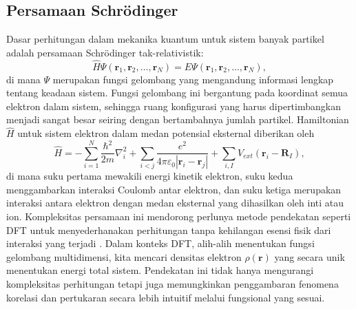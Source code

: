 \subsection{Persamaan Schrödinger}
Dasar perhitungan dalam mekanika kuantum untuk sistem banyak partikel adalah persamaan Schrödinger tak-relativistik:
\begin{equation}
    \hat{H}\Psi(\mathbf{r}_1,\mathbf{r}_2,\ldots,\mathbf{r}_N) = E\Psi(\mathbf{r}_1,\mathbf{r}_2,\ldots,\mathbf{r}_N),
\end{equation}
di mana \(\Psi\) merupakan fungsi gelombang yang mengandung informasi lengkap tentang keadaan sistem.
Fungsi gelombang ini bergantung pada koordinat semua elektron dalam sistem, sehingga ruang konfigurasi yang harus dipertimbangkan menjadi sangat besar seiring dengan bertambahnya jumlah partikel.
Hamiltonian \(\hat{H}\) untuk sistem elektron dalam medan potensial eksternal diberikan oleh
\begin{equation}
    \hat{H} = -\sum_{i=1}^{N}\frac{\hbar^2}{2m}\nabla_i^2 + \sum_{i<j} \frac{e^2}{4\pi\varepsilon_0|\mathbf{r}_i-\mathbf{r}_j|} + \sum_{i,I} V_{ext}(\mathbf{r}_i-\mathbf{R}_I),
\end{equation}
di mana suku pertama mewakili energi kinetik elektron, suku kedua menggambarkan interaksi Coulomb antar elektron, dan suku ketiga merupakan interaksi antara elektron dengan medan eksternal yang dihasilkan oleh inti atau ion.
Kompleksitas persamaan ini mendorong perlunya metode pendekatan seperti DFT untuk menyederhanakan perhitungan tanpa kehilangan esensi fisik dari interaksi yang terjadi \citep{Kohn1965}.
Dalam konteks DFT, alih-alih menentukan fungsi gelombang multidimensi, kita mencari densitas elektron \(\rho(\mathbf{r})\) yang secara unik menentukan energi total sistem.
Pendekatan ini tidak hanya mengurangi kompleksitas perhitungan tetapi juga memungkinkan penggambaran fenomena korelasi dan pertukaran secara lebih intuitif melalui fungsional yang sesuai.

